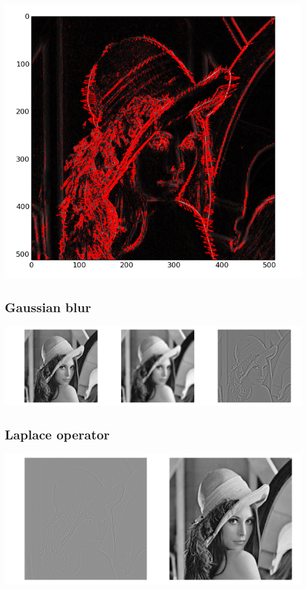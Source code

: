 \documentclass[a4paper,12px]{article}
\begin{document}
\begin{center}
    \includegraphics[width=\textwidth]{gradient}
\end{center}

\subsection{Gaussian blur}



\begin{center}
    \includegraphics[width=\textwidth]{gauss}
\end{center}

\subsection{Laplace operator}



\begin{center}
    \includegraphics[width=\textwidth]{laplace}
\end{center}
\end{document}
